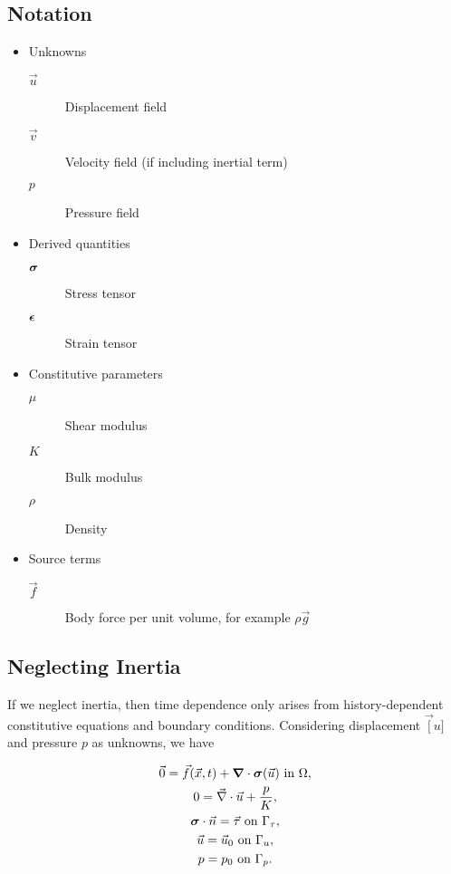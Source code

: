 \subsection{Notation}
\begin{itemize}
\item Unknowns
  \begin{description}
  \item[$\vec{u}$] Displacement field
  \item[$\vec{v}$] Velocity field (if including inertial term)
  \item[$p$] Pressure field
  \end{description}
\item Derived quantities
  \begin{description}
    \item[$\bm{\sigma}$] Stress tensor
    \item[$\bm{\epsilon}$] Strain tensor
  \end{description}
\item Constitutive parameters
  \begin{description}
  \item[$\mu$] Shear modulus
  \item[$K$] Bulk modulus
  \item[$\rho$] Density
  \end{description}
\item Source terms
  \begin{description}
    \item[$\vec{f}$] Body force per unit volume, for example $\rho \vec{g}$
  \end{description}
\end{itemize}

\subsection{Neglecting Inertia}
If we neglect inertia, then time dependence only arises from
history-dependent constitutive equations and boundary
conditions. Considering displacement $\vec[u]$ and pressure $p$ as
unknowns, we have

\begin{gather}
  \vec{0} = \vec{f}(\vec{x},t) + \bm{\nabla} \cdot \bm{\sigma}(\vec{u}) \text{ in }
  \Omega, \\
  0 = \vec{\nabla} \cdot \vec{u} + \frac{p}{K}, \\
  \bm{\sigma} \cdot \vec{n} = \vec{\tau} \text{ on }\Gamma_{\tau}, \\
  \vec{u} = \vec{u}_0 \text{ on }\Gamma_u, \\
  p = p_0 \text{ on }\Gamma_p.
\end{gather}

